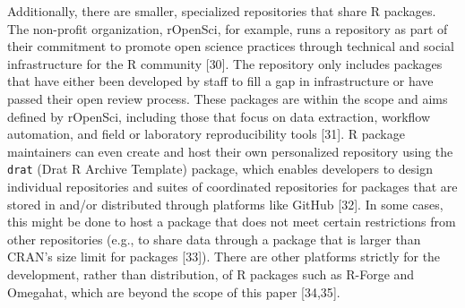 \documentclass[10pt,letterpaper]{article}
\begin{document}
Additionally, there are smaller, specialized repositories that share R
packages. The non-profit organization, rOpenSci, for example, runs a
repository as part of their commitment to promote open science practices
through technical and social infrastructure for the R community
{[}30{]}. The repository only includes packages that have either been
developed by staff to fill a gap in infrastructure or have passed their
open review process. These packages are within the scope and aims
defined by rOpenSci, including those that focus on data extraction,
workflow automation, and field or laboratory reproducibility tools
{[}31{]}. R package maintainers can even create and host their own
personalized repository using the \texttt{drat} (Drat R Archive
Template) package, which enables developers to design individual
repositories and suites of coordinated repositories for packages that
are stored in and/or distributed through platforms like GitHub {[}32{]}.
In some cases, this might be done to host a package that does not meet
certain restrictions from other repositories (e.g., to share data
through a package that is larger than CRAN's size limit for packages
{[}33{]}). There are other platforms strictly for the development,
rather than distribution, of R packages such as R-Forge and Omegahat,
which are beyond the scope of this paper {[}34,35{]}.
\end{document}
